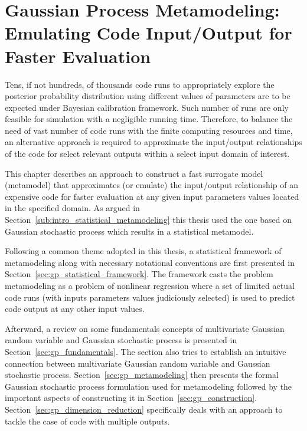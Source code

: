 \chapter[Gaussian Process Metamodeling]{Gaussian Process Metamodeling: Emulating Code Input/Output for Faster Evaluation}\label{ch:gp_metamodel}

Tens, if not hundreds, of thousands code runs to appropriately explore the posterior probability distribution using different values of parameters are to be expected under Bayesian calibration framework.
Such number of runs are only feasible for simulation with a negligible running time.
Therefore, to balance the need of vast number of code runs with the finite computing resources and time, 
an alternative approach is required to approximate the input/output relationships of the code for select relevant outputs within a select input domain of interest. 

This chapter describes an approach to construct a fast surrogate model (metamodel) that approximates (or emulate) the input/output relationship of an expensive code for faster evaluation at any given input parameters values located in the specified domain.
As argued in Section~\ref{sub:intro_statistical_metamodeling} this thesis used the one based on Gaussian stochastic process which results in a statistical metamodel. 

Following a common theme adopted in this thesis, a statistical framework of metamodeling along with necessary notational conventions are first presented in Section~\ref{sec:gp_statistical_framework}.
The framework casts the problem metamodeling as a problem of nonlinear regression where a set of limited actual code runs (with inputs parameters values judiciously selected) is used to predict code output at any other input values.

Afterward, a review on some fundamentals concepts of multivariate Gaussian random variable and Gaussian stochastic process is presented in Section~\ref{sec:gp_fundamentals}.
The section also tries to establish an intuitive connection between multivariate Gaussian random variable and Gaussian stochastic process.
Section~\ref{sec:gp_metamodeling} then presents the formal Gaussian stochastic process formulation used for metamodeling followed by the important aspects of constructing it in Section~\ref{sec:gp_construction}.
Section~\ref{sec:gp_dimension_reduction} specifically deals with an approach to tackle the case of code with multiple outputs.

